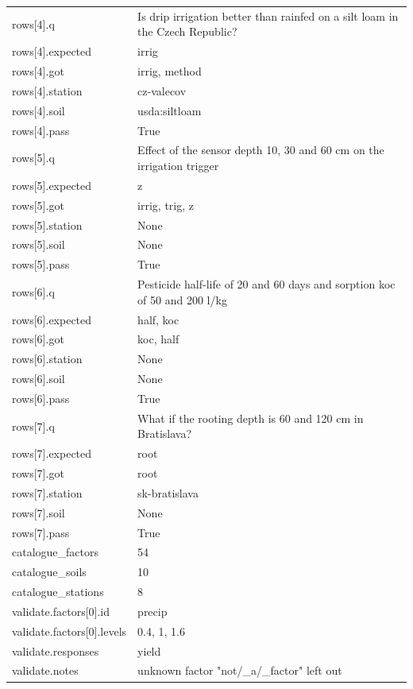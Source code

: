{\begin{longtable}{p{}p{}}
{}rows[4].q & Is drip irrigation better than rainfed on a silt loam in the Czech Republic?\\
{}rows[4].expected & irrig\\
{}rows[4].got & irrig, method\\
{}rows[4].station & cz-valecov\\
{}rows[4].soil & usda:siltloam\\
{}rows[4].pass & True\\
{}rows[5].q & Effect of the sensor depth 10, 30 and 60 cm on the irrigation trigger\\
{}rows[5].expected & z\\
{}rows[5].got & irrig, trig, z\\
{}rows[5].station & None\\
{}rows[5].soil & None\\
{}rows[5].pass & True\\
{}rows[6].q & Pesticide half-life of 20 and 60 days and sorption koc of 50 and 200 l/kg\\
{}rows[6].expected & half, koc\\
{}rows[6].got & koc, half\\
{}rows[6].station & None\\
{}rows[6].soil & None\\
{}rows[6].pass & True\\
{}rows[7].q & What if the rooting depth is 60 and 120 cm in Bratislava?\\
{}rows[7].expected & root\\
{}rows[7].got & root\\
{}rows[7].station & sk-bratislava\\
{}rows[7].soil & None\\
{}rows[7].pass & True\\
{}catalogue\_factors & 54\\
{}catalogue\_soils & 10\\
{}catalogue\_stations & 8\\
{}validate.factors[0].id & precip\\
{}validate.factors[0].levels & 0.4, 1, 1.6\\
{}validate.responses & yield\\
{}validate.notes & unknown factor "not/\_a/\_factor" left out\\
\bottomrule\end{longtable}}
